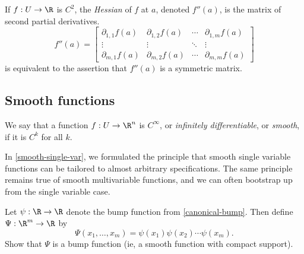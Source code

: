 \begin{remark}
	If $f : U \to \R$ is $C^2$, the \emph{Hessian} of $f$ at $a$, denoted $f''(a)$, is the matrix of second partial derivatives. 
	\[ f''(a) = \begin{bmatrix} \partial_{1,1} f(a) & \partial_{1,2} f(a) & \dotsb & \partial_{1,m} f(a) \\
	\vdots & \vdots & \ddots & \vdots \\
	\partial_{m,1} f(a) & \partial_{m,2} f(a) & \dotsb & \partial_{m,m} f(a) \end{bmatrix} \]
	 is equivalent to the assertion that $f''(a)$ is a symmetric matrix. 
\end{remark}

\subsection{Smooth functions}

\begin{definition}[Smoothness] \label{smooth-multivar}
	We say that a function $f : U \to \R^n$ is $C^\infty$, or \emph{infinitely differentiable}, or \emph{smooth}, if it is $C^k$ for all $k$. 
\end{definition}

In \cref{smooth-single-var}, we formulated the principle that smooth single variable functions can be tailored to almost arbitrary specifications. The same principle remains true of smooth multivariable functions, and we can often bootstrap up from the single variable case. 

\begin{exercise}
	Let $\psi : \R \to \R$ denote the bump function from \cref{canonical-bump}. Then define $\Psi : \R^m \to \R$ by
	\[ \Psi(x_1, \dotsc, x_m) = \psi(x_1) \psi(x_2) \dotsb \psi(x_m). \]
	Show that $\Psi$ is a bump function (ie, a smooth function with compact support). 
\end{exercise}

